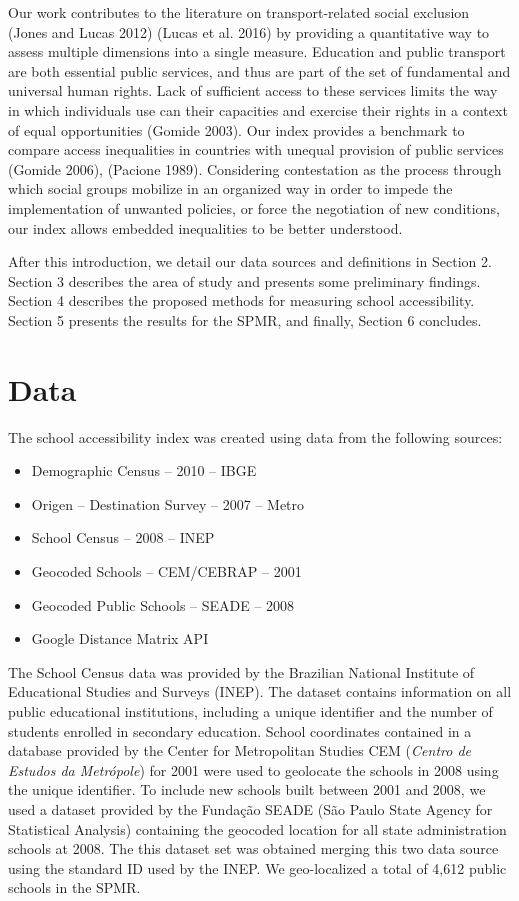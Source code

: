 \documentclass[3p,authoryear,preprint,review,12pt]{elsarticle}
\begin{document}
Our work contributes to the literature on transport-related social
exclusion (Jones and Lucas 2012) (Lucas et al. 2016) by providing a
quantitative way to assess multiple dimensions into a single measure. Education and public transport are both essential public services, and thus are part of the set of fundamental and universal human rights. Lack of sufficient access to these services limits the way in which individuals use can their capacities and exercise their rights in a context of equal opportunities (Gomide 2003). Our index provides a benchmark to compare access inequalities in countries with unequal provision of public services (Gomide 2006), (Pacione 1989). Considering contestation as the process through which social groups mobilize in an organized way in order to impede the implementation of unwanted policies, or force the negotiation of new conditions, our index allows embedded inequalities to be better understood.

After this introduction, we detail our data sources and definitions in Section 2. Section 3 describes the area of study and presents some preliminary findings. Section 4 describes the proposed methods for measuring school accessibility. Section 5 presents the results for the SPMR, and finally, Section 6 concludes.

\section{Data}\label{data}

The school accessibility index was created using data from the following sources: 
\begin{itemize}
\item Demographic Census – 2010 – IBGE
\item Origen – Destination Survey – 2007 – Metro
\item School Census – 2008 – INEP
\item Geocoded Schools – CEM/CEBRAP – 2001
\item Geocoded Public Schools – SEADE – 2008
\item Google Distance Matrix API 
\end{itemize}

The School Census data was provided by the Brazilian National Institute of Educational Studies and Surveys (INEP).
The dataset contains information on all public educational
institutions, including a unique identifier and the number of students enrolled in secondary education. School coordinates contained in a database provided by the Center for Metropolitan Studies CEM (\textit{Centro de Estudos da Metrópole}) for 2001 were used to geolocate the schools in 2008 using the unique identifier.
To include new schools built between 2001 and 2008, we used a dataset provided by the Fundação SEADE (São Paulo State Agency for Statistical Analysis) containing the geocoded location for all state administration schools at 2008. The this dataset set was obtained merging this two data source using the standard ID used by the INEP. We geo-localized a total of 4,612 public schools in the SPMR.
\end{document}
